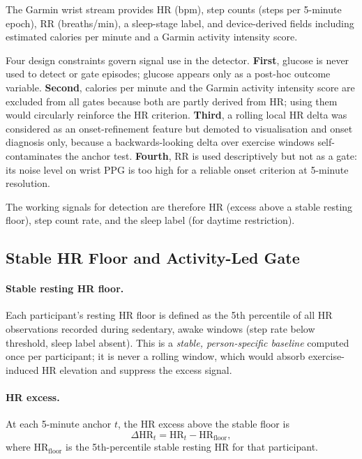 The Garmin wrist stream provides HR (bpm), step counts (steps per 5-minute
epoch), RR (breaths/min), a sleep-stage label, and device-derived fields
including estimated calories per minute and a Garmin activity intensity score.

Four design constraints govern signal use in the detector.
\textbf{First}, glucose is never used to detect or gate episodes; glucose
appears only as a post-hoc outcome variable.
\textbf{Second}, calories per minute and the Garmin activity intensity score
are excluded from all gates because both are partly derived from HR; using them
would circularly reinforce the HR criterion.
\textbf{Third}, a rolling local HR delta was considered as an onset-refinement
feature but demoted to visualisation and onset diagnosis only, because a
backwards-looking delta over exercise windows self-contaminates the anchor test.
\textbf{Fourth}, RR is used descriptively but not as a gate: its noise level
on wrist PPG is too high for a reliable onset criterion at 5-minute resolution.

The working signals for detection are therefore HR (excess above a stable
resting floor), step count rate, and the sleep label (for daytime restriction).

\subsection{Stable HR Floor and Activity-Led Gate}
\label{subsec:ex_gate}

\paragraph{Stable resting HR floor.}
Each participant's resting HR floor is defined as the 5th percentile of
all HR observations recorded during sedentary, awake windows
(step rate below threshold, sleep label absent).
This is a \emph{stable, person-specific baseline} computed once per
participant; it is never a rolling window, which would absorb exercise-induced
HR elevation and suppress the excess signal.

\paragraph{HR excess.}
At each 5-minute anchor $t$, the HR excess above the stable floor is
\begin{equation}
  \Delta\mathrm{HR}_{t} = \mathrm{HR}_{t} - \mathrm{HR}_{\text{floor}},
  \label{eq:hr_excess}
\end{equation}
where $\mathrm{HR}_{\text{floor}}$ is the 5th-percentile stable resting HR
for that participant.

